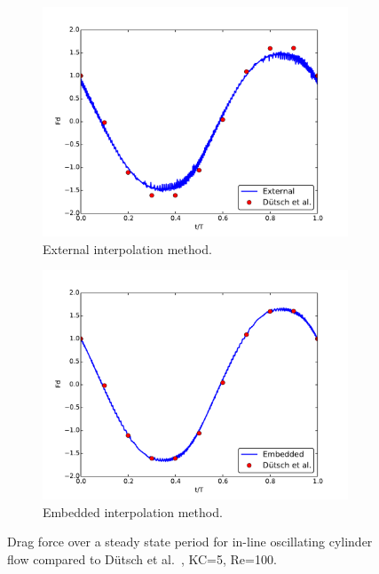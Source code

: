 \documentclass[preprint,12pt,5p]{elsarticle}
\begin{document}
\begin{figure}[!htb]
	\centering
	\begin{subfigure}{0.5\textwidth}
		\includegraphics[width=\linewidth]{staticexss}
		\caption{External interpolation method.}
	\end{subfigure}
	
	\begin{subfigure}{0.5\textwidth}
		\includegraphics[width=\linewidth]{staticemss}
		\caption{Embedded interpolation method.}
	\end{subfigure}
	\caption{Drag force over a steady state period for in-line oscillating cylinder flow compared to D\"{u}tsch et al.~\cite{dutsch1998low}, KC=5, Re=100.}
	\label{fig:static2}
\end{figure}
\end{document}
